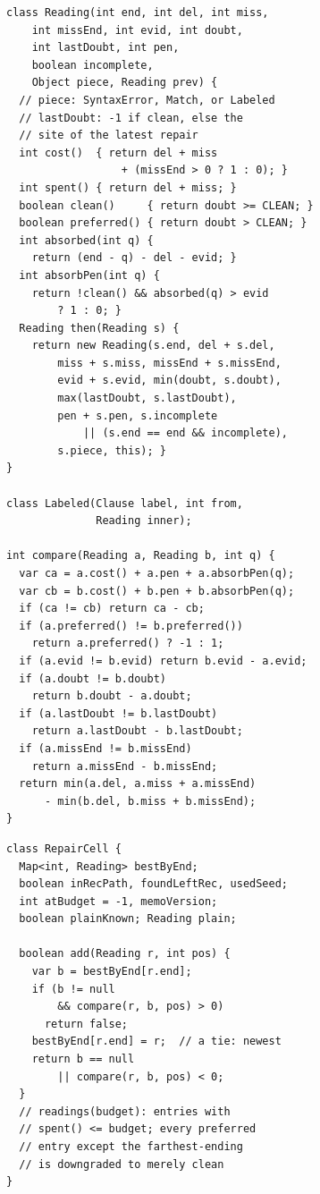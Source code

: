 \documentclass[manuscript]{acmart}
\begin{document}
\begin{figure}
\centering
\begin{subfigure}[t]{.46\linewidth}
\begin{lstlisting}
class Reading(int end, int del, int miss,
    int missEnd, int evid, int doubt,
    int lastDoubt, int pen,
    boolean incomplete,
    Object piece, Reading prev) {
  // piece: SyntaxError, Match, or Labeled
  // lastDoubt: -1 if clean, else the
  // site of the latest repair
  int cost()  { return del + miss
                  + (missEnd > 0 ? 1 : 0); }
  int spent() { return del + miss; }
  boolean clean()     { return doubt >= CLEAN; }
  boolean preferred() { return doubt > CLEAN; }
  int absorbed(int q) {
    return (end - q) - del - evid; }
  int absorbPen(int q) {
    return !clean() && absorbed(q) > evid
        ? 1 : 0; }
  Reading then(Reading s) {
    return new Reading(s.end, del + s.del,
        miss + s.miss, missEnd + s.missEnd,
        evid + s.evid, min(doubt, s.doubt),
        max(lastDoubt, s.lastDoubt),
        pen + s.pen, s.incomplete
            || (s.end == end && incomplete),
        s.piece, this); }
}

class Labeled(Clause label, int from,
              Reading inner);

int compare(Reading a, Reading b, int q) {
  var ca = a.cost() + a.pen + a.absorbPen(q);
  var cb = b.cost() + b.pen + b.absorbPen(q);
  if (ca != cb) return ca - cb;
  if (a.preferred() != b.preferred())
    return a.preferred() ? -1 : 1;
  if (a.evid != b.evid) return b.evid - a.evid;
  if (a.doubt != b.doubt)
    return b.doubt - a.doubt;
  if (a.lastDoubt != b.lastDoubt)
    return a.lastDoubt - b.lastDoubt;
  if (a.missEnd != b.missEnd)
    return a.missEnd - b.missEnd;
  return min(a.del, a.miss + a.missEnd)
      - min(b.del, b.miss + b.missEnd);
}
\end{lstlisting}
\end{subfigure}
\hspace{5mm}
\begin{subfigure}[t]{.46\linewidth}
\begin{lstlisting}[firstnumber=49]
class RepairCell {
  Map<int, Reading> bestByEnd;
  boolean inRecPath, foundLeftRec, usedSeed;
  int atBudget = -1, memoVersion;
  boolean plainKnown; Reading plain;

  boolean add(Reading r, int pos) {
    var b = bestByEnd[r.end];
    if (b != null
        && compare(r, b, pos) > 0)
      return false;
    bestByEnd[r.end] = r;  // a tie: newest
    return b == null
        || compare(r, b, pos) < 0;
  }
  // readings(budget): entries with
  // spent() <= budget; every preferred
  // entry except the farthest-ending
  // is downgraded to merely clean
}



\end{lstlisting}
\end{subfigure}
\end{figure}
\end{document}
